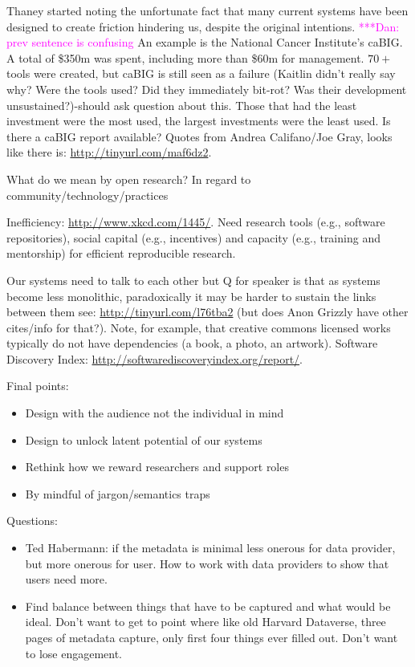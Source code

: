 \documentclass[11pt, oneside]{amsart}
\newcommand{\katznote}[1]{ {\textcolor{magenta}    { ***Dan:      #1 }}}
\begin{document}
Thaney started noting the unfortunate fact that many current systems have been designed to create friction hindering us, despite the original intentions. \katznote{prev sentence is confusing}%
An example is the National Cancer Institute's caBIG. 
A total of \$350m was spent, including more than \$60m for management.  $70+$ tools were created, but caBIG is still seen
as a failure (Kaitlin didn't really say why? Were the tools used? Did they
immediately bit-rot? Was their development unsustained?)-should ask question
about this.
 Those that had the least investment were the most used, the largest
investments were the least used.
 Is there a caBIG report available? Quotes from Andrea Califano/Joe Gray,
looks like there is:
\url{http://tinyurl.com/maf6dz2}. %

What do we mean by open research? In regard to
community/technology/practices

Inefficiency: \url{http://www.xkcd.com/1445/}. Need research tools (e.g., software repositories), social capital (e.g.,
incentives) and capacity (e.g., training and mentorship) for efficient reproducible
research.

 
Our systems need to talk to each other but Q for speaker is that as
systems become less monolithic, paradoxically it may be harder to sustain the
links between them see:
\url{http://tinyurl.com/l76tba2} %
(but does Anon Grizzly have other cites/info for that?).
Note, for example, that creative commons licensed works typically do not 
have dependencies (a book, a photo, an artwork).
Software Discovery Index: \url{http://softwarediscoveryindex.org/report/}.

 Final points:
\begin{itemize}
\item Design with the audience not the individual in mind
\item Design to unlock latent potential of our systems
\item Rethink how we reward researchers and support roles
\item By mindful of jargon/semantics traps
\end{itemize}

Questions:
\begin{itemize}
\item Ted Habermann: if the metadata is minimal less onerous for data provider,
but more onerous for user. How to work with data providers to show that users
need more.
\item Find balance between things that have to be captured and what would be
ideal. Don't want to get to point where like old Harvard Dataverse, three pages
of metadata capture, only first four things ever filled out. Don't want to lose
engagement.
\end{itemize}
 
\end{document}

